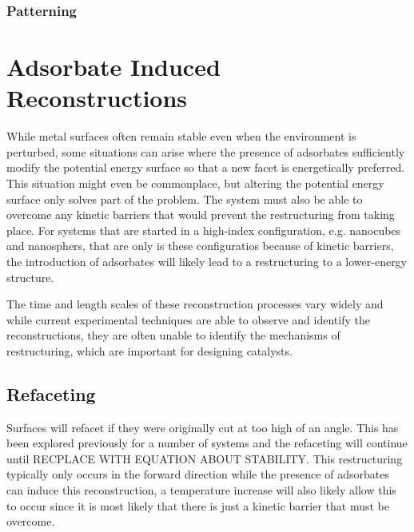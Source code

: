 \subsubsection{Patterning}

\section{Adsorbate Induced Reconstructions}

While metal surfaces often remain stable even when the environment is
perturbed, some situations can arise where the presence of adsorbates
sufficiently modify the potential energy surface so that a new facet is
energetically preferred. This situation might even be commonplace, but altering
the potential energy surface only solves part of the problem. The system must
also be able to overcome any kinetic barriers that would prevent the
restructuring from taking place. For systems that are started in a high-index
configuration, e.g. nanocubes and nanosphers, that are only is these
configuratios because of kinetic barriers, the introduction of adsorbates will
likely lead to a restructuring to a lower-energy structure. 

The time and length scales of these reconstruction processes vary
widely\citep{} and while current experimental techniques are able to observe
and identify the reconstructions, they are often unable to identify the
mechanisms of restructuring, which are important for designing catalysts.

\subsection{Refaceting}
Surfaces will refacet if they were originally cut at too high of an angle. This
has been explored previously for a number of systems\citep{Jeong:1999aa} and the refaceting
will continue until RECPLACE WITH EQUATION ABOUT STABILITY. This restructuring
typically only occurs in the forward direction while the presence of adsorbates
can induce this reconstruction, a temperature increase will also likely allow
this to occur since it is most likely that there is just a kinetic barrier that
must be overcome. 

